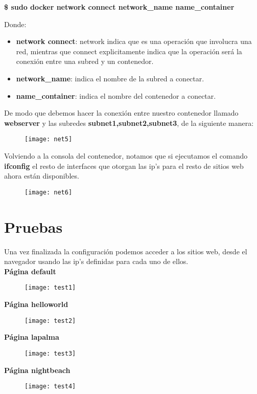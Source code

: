 \documentclass[10pt,letterpaper]{article}
\begin{document}
\begin{enumerate}
\textbf{\$ sudo docker network connect network\_name name\_container}

Donde:
\begin{itemize}
\item \textbf{network connect}: network indica que es una operaci\'on que involucra una red, mientras que connect explicitamente indica que la operaci\'on ser\'a la conexi\'on entre una subred y un contenedor.
\item \textbf{network\_name}: indica el nombre de la subred a conectar.
\item \textbf{name\_container}: indica el nombre del contenedor a conectar.
\end{itemize}

De modo que debemos hacer la conexi\'on entre nuestro contenedor llamado \textbf{webserver} y las subredes \textbf{subnet1,subnet2,subnet3}, de la siguiente manera:

\begin{figure}[h]
\texttt{[image: net5]}
\centering
\end{figure}

Volviendo a la consola del contenedor, notamos que si ejecutamos el comando \textbf{ifconfig} el resto de interfaces que otorgan las ip's para el resto de sitios web ahora est\'an disponibles.

\begin{figure}[h]
\texttt{[image: net6]}
\centering
\end{figure}

\clearpage
\section{Pruebas}
Una vez finalizada la configuraci\'on podemos acceder a los sitios web, desde el navegador usando las ip's definidas para cada uno de ellos.\\

\textbf{P\'agina default}
\begin{figure}[h]
\texttt{[image: test1]}
\end{figure}

\clearpage

\textbf{P\'agina helloworld}
\begin{figure}[h]
\texttt{[image: test2]}
\end{figure}

\clearpage

\textbf{P\'agina lapalma}
\begin{figure}[h]
\texttt{[image: test3]}
\end{figure}

\clearpage

\textbf{P\'agina nightbeach}
\begin{figure}[h]
\texttt{[image: test4]}
\end{figure}

\clearpage
\end{enumerate}
\end{document}
